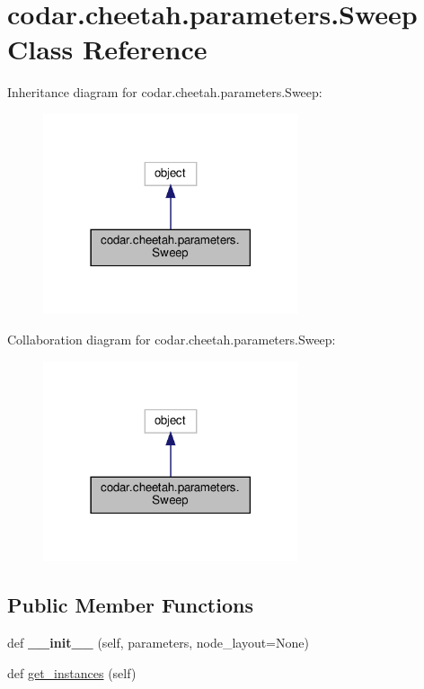 \hypertarget{classcodar_1_1cheetah_1_1parameters_1_1_sweep}{}\section{codar.\+cheetah.\+parameters.\+Sweep Class Reference}
\label{classcodar_1_1cheetah_1_1parameters_1_1_sweep}


Inheritance diagram for codar.\+cheetah.\+parameters.\+Sweep\+:
\nopagebreak
\begin{figure}[H]
\begin{center}
\leavevmode
\includegraphics[width=213pt]{classcodar_1_1cheetah_1_1parameters_1_1_sweep__inherit__graph}
\end{center}
\end{figure}


Collaboration diagram for codar.\+cheetah.\+parameters.\+Sweep\+:
\nopagebreak
\begin{figure}[H]
\begin{center}
\leavevmode
\includegraphics[width=213pt]{classcodar_1_1cheetah_1_1parameters_1_1_sweep__coll__graph}
\end{center}
\end{figure}
\subsection*{Public Member Functions}
\begin{DoxyCompactItemize}
\item 
\mbox{\label{classcodar_1_1cheetah_1_1parameters_1_1_sweep_a3cdd4f58ac7324ac0f85c7f28f4bfee0}} 
def {\bfseries \+\_\+\+\_\+init\+\_\+\+\_\+} (self, parameters, node\+\_\+layout=None)
\item 
def \hyperlink{classcodar_1_1cheetah_1_1parameters_1_1_sweep_a25c111a2541f852d385d84baf51e9687}{get\+\_\+instances} (self)
\end{DoxyCompactItemize}
